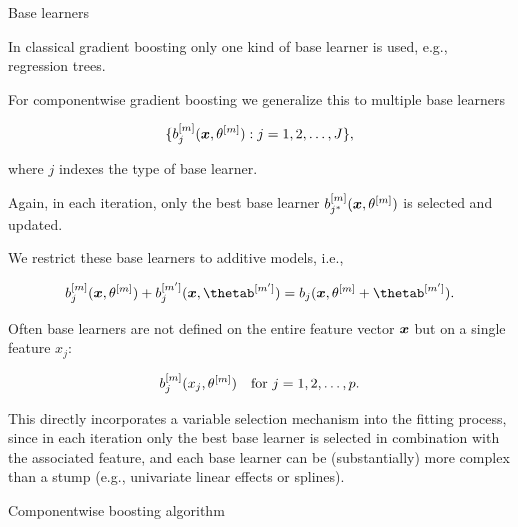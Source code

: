
\begin{vbframe}{Base learners}

In classical gradient boosting only one kind of base learner is used, e.g., 
regression trees.

\lz

For componentwise gradient boosting we generalize this to multiple base learners 

$$
  \{ b^{[m]}_j(\bm{x}, \theta^{[m]}): j = 1, 2, \dots, J \},
$$

where $j$ indexes the type of base learner.

\lz

Again, in each iteration, only the best base learner 
$b^{[m]}_{j^\ast}(\bm{x}, \theta^{[m]})$ is selected and updated.

\framebreak


We restrict these base learners to additive models, i.e.,

$$
 \bmm_j(\xv, \thetam) + b_j^{[m^\prime]}(\xv, \thetab^{[m^\prime]}) = 
 b_j(\xv, \thetam + \thetab^{[m^\prime]}).
$$

\lz

Often base learners are not defined on the entire feature vector $\bm{x}$ but on 
a single feature $x_j$:

$$
  b^{[m]}_j(x_j, \theta^{[m]}) \quad \text{for } j = 1, 2, \dots, p.
$$

\lz
This directly incorporates a variable selection mechanism into the fitting 
process, since in each iteration only the best base learner is selected in 
combination with the associated feature, and each base learner can be 
(substantially) more complex than a stump (e.g., univariate linear effects or 
splines).

\end{vbframe}


\begin{vbframe}{Componentwise boosting algorithm}



\end{vbframe}

